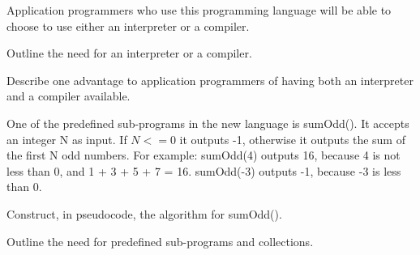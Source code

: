 \begin{exercise*}
Application programmers who use this programming language will be able to choose to use either an interpreter or a compiler.
\begin{parts}
\item Outline the need for an interpreter or a compiler.
\item Describe one advantage to application programmers of having both an interpreter and a compiler available.
\end{parts}
One of the predefined sub-programs in the new language is sumOdd(). It accepts an integer N as input. If $N <= 0$ it outputs -1, otherwise it outputs the sum of the first N odd numbers.
For example:
sumOdd(4) outputs 16, because 4 is not less than 0, and 1 + 3 + 5 + 7 = 16.
sumOdd(-3) outputs -1, because -3 is less than 0.
\begin{parts}
\item Construct, in pseudocode, the algorithm for sumOdd().
\item Outline the need for predefined sub-programs and collections.
\end{parts}
\end{exercise*}

